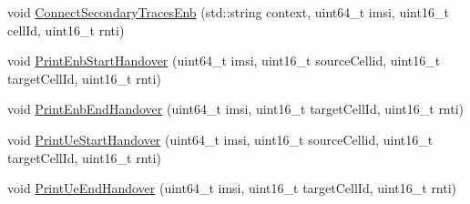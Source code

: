 \begin{DoxyCompactItemize}
\item 
void \hyperlink{classns3_1_1MmWaveBearerStatsConnector_a594e4190deade20af31f677f1e145b49}{Connect\+Secondary\+Traces\+Enb} (std\+::string context, uint64\+\_\+t imsi, uint16\+\_\+t cell\+Id, uint16\+\_\+t rnti)
\item 
void \hyperlink{classns3_1_1MmWaveBearerStatsConnector_a77e55c306256ba12971e9ceb78aa221c}{Print\+Enb\+Start\+Handover} (uint64\+\_\+t imsi, uint16\+\_\+t source\+Cellid, uint16\+\_\+t target\+Cell\+Id, uint16\+\_\+t rnti)
\item 
void \hyperlink{classns3_1_1MmWaveBearerStatsConnector_a3a00650fa58606b58ecb3ff07e588f19}{Print\+Enb\+End\+Handover} (uint64\+\_\+t imsi, uint16\+\_\+t target\+Cell\+Id, uint16\+\_\+t rnti)
\item 
void \hyperlink{classns3_1_1MmWaveBearerStatsConnector_a84fdb3dc2921731bb6f116b9c2e860b4}{Print\+Ue\+Start\+Handover} (uint64\+\_\+t imsi, uint16\+\_\+t source\+Cellid, uint16\+\_\+t target\+Cell\+Id, uint16\+\_\+t rnti)
\item 
void \hyperlink{classns3_1_1MmWaveBearerStatsConnector_a9a0a940a012cd9a27dd3de411f0a73cf}{Print\+Ue\+End\+Handover} (uint64\+\_\+t imsi, uint16\+\_\+t target\+Cell\+Id, uint16\+\_\+t rnti)
\end{DoxyCompactItemize}
